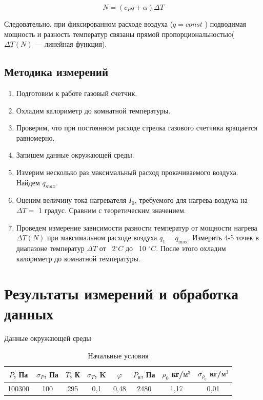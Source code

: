 \documentclass[a4paper,12pt]{article}
\begin{document}
\begin{equation}
    N = (c_{P}q +\alpha)\Delta T
\end{equation}

Следовательно, при фиксированном расходе воздуха ($q = const$ ) подводимая мощность и разность температур связаны прямой пропорциональностью($\Delta T(N)$ — линейная функция).
		
\subsection*{Методика измерений}

\begin{enumerate}
    \item Подготовим к работе газовый счетчик.
    \item Охладим калориметр до комнатной температуры. 
    \item Проверим, что при постоянном расходе стрелка газового счетчика вращается равномерно.
    \item Запишем данные окружающей среды.
    \item Измерим несколько раз максимальный расход прокачиваемого воздуха. Найдем $q_{max}$. 
    \item Оценим величину тока нагревателя $I_0$, требуемого для нагрева воздуха на $\Delta T =$ 1 градус. Сравним с теоретическим значением.
    \item Проведем измерение зависимости разности температур от мощности
    нагрева $\Delta T(N)$ при максимальном расходе воздуха $q_1 = q_{\text{max}}$. Измерить 4-5 точек в диапазоне температур $\Delta T$ от ~2$^\circ C$ до ~10 $^\circ C$. После этого охладим калориметр до комнатной температуры.
\end{enumerate}

\section{Результаты измерений и обработка данных}
Данные окружающей среды

\begin{table}[H]
    \centering
    \begin{tabular}{|c|c|c|c|c|c|c|c|}
    \hline
        $P$, Па & $\sigma_P$, Па & $T$, К & $\sigma_T$, K & $\varphi$  & $P_н$, Па & $\rho_0$ кг/$м^3$ & $ \sigma_{\rho_0}$ кг/$м^3$ \\ \hline
        100300 & 100 & 295 & 0,1 & 0,48 & 2480 & 1,17 & 0,01 \\ \hline
    \end{tabular}
    \caption{Начальные условия}
\end{table}
\end{document}
